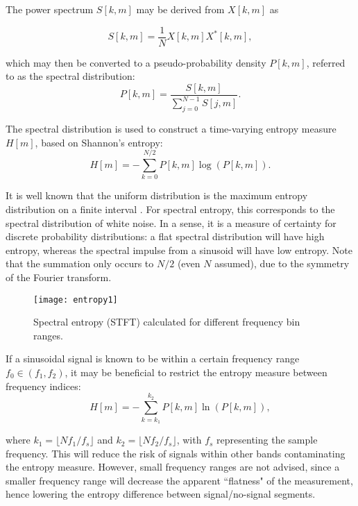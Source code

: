 The power spectrum $S[k, m]$ may be derived from $X[k, m]$ as

\begin{equation*}
	S[k,m] = \frac{1}{N}X[k,m] X^*[k,m],
\end{equation*}

\noindent which may then be converted to a pseudo-probability density $P[k,m]$, referred to as the spectral distribution:
\begin{equation}
\label{eqn:specdist}
	P[k,m] = \frac{S[k,m]}{\sum_{j=0}^{N-1} S[j,m]}.
\end{equation}

The spectral distribution is used to construct a time-varying entropy measure $H[m]$, based on Shannon's entropy:
\begin{equation}
\label{eqn:entropy}
	H[m] = - \sum_{k=0}^{N/2} P[k,m] \log (P[k,m]).
\end{equation}

It is well known that the uniform distribution is the maximum entropy distribution on a finite interval \citep{maxentropy}.  For spectral entropy, this corresponds to the spectral distribution of white noise. In a sense, it is a measure of certainty for discrete probability distributions: a flat spectral distribution will have high entropy, whereas the spectral impulse from a sinusoid will have low entropy. Note that the summation only occurs to $N/2$ (even $N$ assumed), due to the symmetry of the Fourier transform.

\begin{figure}[!t]
	\centering
	\texttt{[image: entropy1]}
	\caption{Spectral entropy (STFT) calculated for different frequency bin ranges.}
	\label{fig:entropy1}
\end{figure}

If a sinusoidal signal is known to be within a certain frequency range $f_0 \in (f_1, f_2)$, it may be beneficial to restrict the entropy measure between frequency indices:
\begin{equation*}
	H[m] = - \sum_{k=k_1}^{k_2} P[k,m] \ln (P[k,m]),
\end{equation*}

\noindent where $k_1 = \lfloor N f_1/f_s\rfloor$ and $k_2 = \lfloor N f_2/f_s\rfloor$, with $f_s$ representing the sample frequency. This will reduce the risk of signals within other bands contaminating the entropy measure. However, small frequency ranges are not advised, since a smaller frequency range will decrease the apparent ``flatness" of the measurement, hence lowering the entropy difference between signal/no-signal segments.

